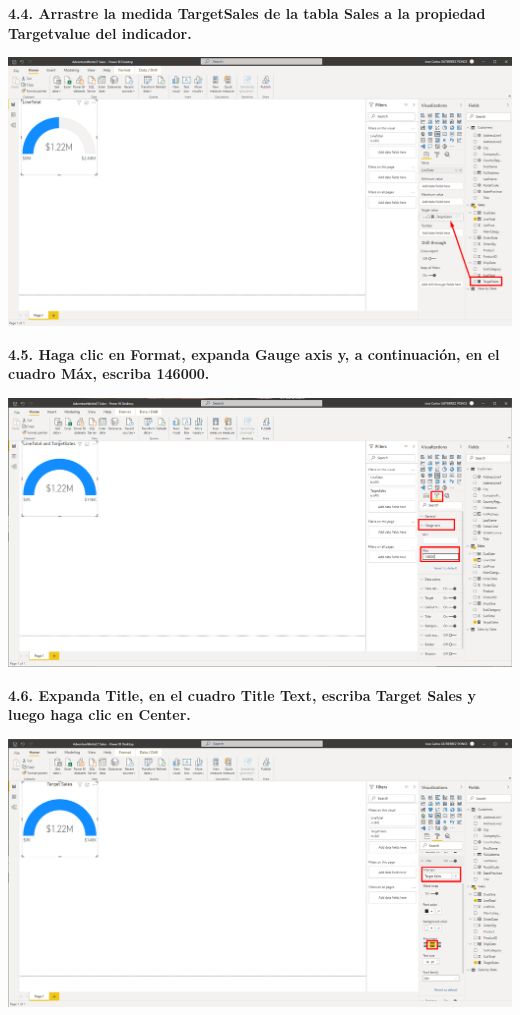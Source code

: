 \documentclass{article}
\begin{document}
\textbf{4.4. Arrastre la medida \textbf{TargetSales} de la tabla \textbf{Sales} a la propiedad \textbf{Targetvalue} del indicador.}

    \begin{center}
		\includegraphics[width=14cm]{./images/80} 
	\end{center}

\newpage
\textbf{4.5. Haga clic en \textbf{Format}, expanda \textbf{Gauge axis} y, a continuación, en el cuadro \textbf{Máx}, escriba \textbf{146000}.}

    \begin{center}
		\includegraphics[width=14cm]{./images/81} 
	\end{center}


\textbf{4.6. Expanda \textbf{Title}, en el cuadro \textbf{Title Text}, escriba \textbf{Target Sales} y luego haga clic en \textbf{Center}.}

    \begin{center}
		\includegraphics[width=14cm]{./images/82} 
	\end{center}
\end{document}
